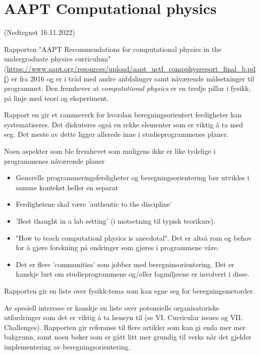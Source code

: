 

\section{AAPT Computational physics}

(Nedtegnet 16.11.2022)

Rapporten "AAPT Recommendations for computational physics in the undergraduate physics curriculum" (\url{https://www.aapt.org/resources/upload/aapt_uctf_compphysreport_final_b.pdf})  er fra 2016 og er i tråd med andre anbfalinger samt nåværende målsetninger til programmet. Den fremhever at \textit{computational physics} er en tredje pillar i fysikk, på linje med teori og eksperiment.

Rapport en gir et rammeverk for hvordan beregningsorientert ferdigheter kan systematiseres. Det diskuteres også en rekke elementer som er viktig å ta med seg. Det meste av dette ligger allerede inne i studieprogrammenes planer.

Noen aspekter som ble fremhevet som muligens ikke er like tydelige i programmenes nåværende planer

\begin{itemize}
	\item Generelle programmeringsferdigheter og beregningsorientering bør utvikles i samme kontekst heller en separat
	\item Ferdighetene skal være 'authentic to the discipline'
	\item 'Best thaught in a lab setting' (i motsetning til typisk teorikurs).
	\item "How to teach computationl physics is anecdotal". Det er altså rom og behov for å gjøre forskning på endringer som gjøres i programmene våre.
	\item Det er flere 'communities' som jobber med beregninsorientering. Det er kanskje lurt om studieprogrammene og/eller fagmiljøene er involvert i disse.
\end{itemize}

Rapporten gir en liste over fysikk-tema som kan egne seg for beregningsmetorder.

Av spesiell interesse er kanskje en liste over potensielle organisatoriske utfordringer som det er viktig å ta hensyn til (se VI. Curricular issues og VII. Challenges).
Rapporten gir referanse til flere artikler som kan gi enda mer mer bakgrunn, samt noen bøker som er gått litt mer grundig til verks når det gjelder implementering av beregningsorientering.
